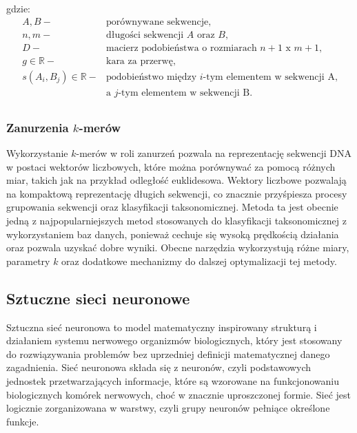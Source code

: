             gdzie:
            \begin{align*}
                A, B -& \text{porównywane sekwencje}, \\
                n, m -& \text{długości sekwencji } A \text{ oraz } B, \\
                D -& \text{macierz podobieństwa o rozmiarach } n + 1 \text{ x } m + 1, \\
                g \in \mathbb{R} -& \text{kara za przerwę}, \\
                s(A_i, B_j) \in \mathbb{R} -& \text{podobieństwo między } i \text{-tym elementem w sekwencji A,} \\
                & \text{a } j \text{-tym elementem w sekwencji B}. \\
            \end{align*}

        \subsubsection{Zanurzenia $k$-merów}

            Wykorzystanie $k$-merów w roli zanurzeń pozwala na reprezentację sekwencji DNA w postaci wektorów liczbowych, które można porównywać za pomocą różnych miar, takich jak na przykład odległość euklidesowa. Wektory liczbowe pozwalają na kompaktową reprezentację długich sekwencji, co znacznie przyśpiesza procesy grupowania sekwencji oraz klasyfikacji taksonomicznej. Metoda ta jest obecnie jedną z najpopularniejszych metod stosowanych do klasyfikacji taksonomicznej z wykorzystaniem baz danych, ponieważ cechuje się wysoką prędkością działania oraz pozwala uzyskać dobre wyniki. Obecne narzędzia wykorzystują różne miary, parametry $k$ oraz dodatkowe mechanizmy do dalszej optymalizacji tej metody.

    \subsection{Sztuczne sieci neuronowe}

        Sztuczna sieć neuronowa to model matematyczny inspirowany strukturą i działaniem systemu nerwowego organizmów biologicznych, który jest stosowany do rozwiązywania problemów bez uprzedniej definicji matematycznej danego zagadnienia\cite{Leksykon}. Sieć neuronowa składa się z neuronów, czyli podstawowych jednostek przetwarzających informacje, które są wzorowane na funkcjonowaniu biologicznych komórek nerwowych, choć w znacznie uproszczonej formie\cite{Leksykon}. Sieć jest logicznie zorganizowana w warstwy, czyli grupy neuronów pełniące określone funkcje\cite{Leksykon}.

